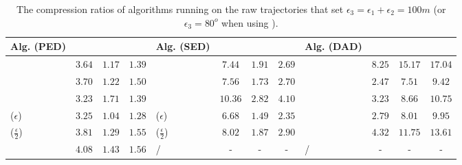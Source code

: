 \begin{table}
	\caption{\small The compression ratios of algorithms running on the raw trajectories that set $\epsilon_3=\epsilon_1+\epsilon_2=100m$ (or $\epsilon_3=80^o$ when using \dad).}
	\centering
	\scriptsize
	\vspace{-1ex}
	\begin{tabular}{|l|c|c|c|l|c|c|c|l|c|c|c|}
		\hline
		\bf{Alg. (PED)}  &\ucar &\geolife &\mopsi & \bf{Alg. (SED)}  &\ucar &\geolife &\mopsi &\bf{Alg. (DAD)}  &\ucar &\geolife &\mopsi \\
		\hline
		{\dpa} &	$3.64$ & $ 1.17$ &	$1.39$	&\dpa &$7.44$ &$1.91$ & $2.69$ & \dpa	& $8.25$	& $15.17$	& $17.04$ \\
		\hline
		{\tpa} &	$3.70 $ & $1.22$ &	$1.50 $	&\tpa 	& $7.56 $& $1.73 $ &$2.70$ & \tpa	& $2.47 $	& $ 	7.51 $	& $ 	9.42  $ \\
		\hline
		{\bqsa} &	$3.23$ & $1.71$ &	$1.39 $	&\squishe &$10.36 $ & $ 2.82 $ & $4.10$ & \opwa	& $3.23$	& $8.66$	& $10.75$ \\
		\hline
		{\siped($\epsilon$)} &	$3.25$ & $ 1.04$ &	$1.28 $	&\cised($\epsilon$) & $6.68 $ &$ 	1.49 $ &$ 	2.35$ & \interval	& $2.79 $	& $8.01$	& $9.95 $ \\
		\hline
		{\siped($\frac{\epsilon}{2}$)} &	$3.81 $ & $1.29 $ &	$1.55 $ &\cised($\frac{\epsilon}{2}$) &$8.02  $ & $1.87$ & $2.90$& \intersec	& $4.32 $	& $11.75$	& $13.61 $ \\
		\hline
		{\operb} &	$4.08 $ & $1.43 $ & $1.56 $	&  / &- &- &- & /&- &- &- \\
		\hline
	\end{tabular}
	\label{tab:cr}	
	\vspace{-2ex}
\end{table}
 	 	
 	 	
 	 	


